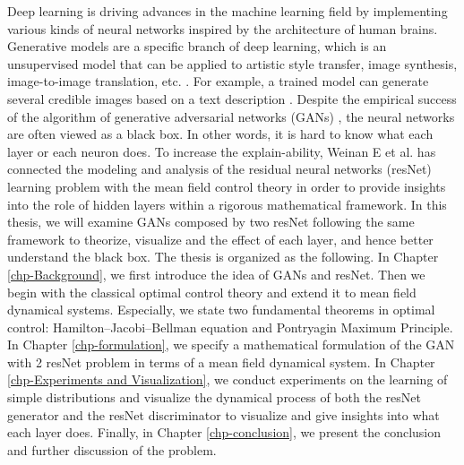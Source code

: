 Deep learning is driving advances in the machine learning field by implementing various kinds of neural networks inspired by the architecture of human brains. Generative models are a specific branch of deep learning, which is an unsupervised model that can be applied to artistic style transfer, image synthesis, image-to-image translation, etc. \cite{IEEE_intro}\cite{reed2016generative}\cite{li2016precomputed}. For example, a trained model can generate several credible images based on a text description \cite{reed2016learning}. Despite the empirical success of the algorithm of generative adversarial networks (GANs) \cite{goodfellow2014generative}, the neural networks are often viewed as a black box. In other words, it is hard to know what each layer or each neuron does. To increase the explain-ability, Weinan E et al. \cite{weinan2018mean} has connected the modeling and analysis of the residual neural networks (resNet) learning problem \cite{he2016deep} with the mean field control theory \cite{bensoussan2013mean} in order to provide insights into the role of hidden layers within a rigorous mathematical framework. In this thesis, we will examine GANs composed by two resNet following the same framework to theorize, visualize and the effect of each layer, and hence better understand the black box. The thesis is organized as the following. In Chapter \ref{chp-Background}, we first introduce the idea of GANs and resNet. Then we begin with the classical optimal control theory and extend it to mean field dynamical systems. Especially, we state two fundamental theorems in optimal control: Hamilton–Jacobi–Bellman equation and Pontryagin Maximum Principle. In Chapter \ref{chp-formulation}, we specify a mathematical formulation of the GAN with 2 resNet problem in terms of a mean field dynamical system. In Chapter \ref{chp-Experiments and Visualization}, we conduct experiments on the learning of simple distributions and visualize the dynamical process of both the resNet generator and the resNet discriminator to visualize and give insights into what each layer does. Finally, in Chapter \ref{chp-conclusion}, we present the conclusion and further discussion of the problem.